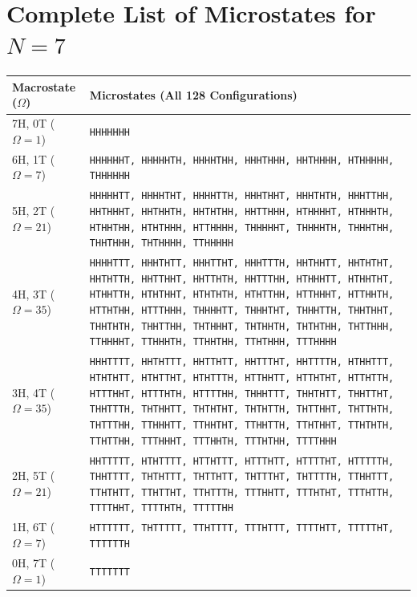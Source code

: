 \documentclass[11pt, a4paper]{article}
\begin{document}
\section{Complete List of Microstates for $N=7$}
\label{app:n7}
\begin{center}
\footnotesize
\begin{tabularx}{\linewidth}{@{}l>{\raggedright\arraybackslash}X@{}}
\toprule
\textbf{Macrostate ($\Omega$)} & \textbf{Microstates (All 128 Configurations)} \\
\midrule
7H, 0T ($\Omega=1$) & \texttt{HHHHHHH} \\
\addlinespace[3pt]
6H, 1T ($\Omega=7$) & \texttt{HHHHHHT, HHHHHTH, HHHHTHH, HHHTHHH, HHTHHHH, HTHHHHH, THHHHHH} \\
\addlinespace[3pt]
5H, 2T ($\Omega=21$) & \texttt{HHHHHTT, HHHHTHT, HHHHTTH, HHHTHHT, HHHTHTH, HHHTTHH, HHTHHHT, HHTHHTH, HHTHTHH, HHTTHHH, HTHHHHT, HTHHHTH, HTHHTHH, HTHTHHH, HTTHHHH, THHHHHT, THHHHTH, THHHTHH, THHTHHH, THTHHHH, TTHHHHH} \\
\addlinespace[3pt]
4H, 3T ($\Omega=35$) & \texttt{HHHHTTT, HHHTHTT, HHHTTHT, HHHTTTH, HHTHHTT, HHTHTHT, HHTHTTH, HHTTHHT, HHTTHTH, HHTTTHH, HTHHHTT, HTHHTHT, HTHHTTH, HTHTHHT, HTHTHTH, HTHTTHH, HTTHHHT, HTTHHTH, HTTHTHH, HTTTHHH, THHHHTT, THHHTHT, THHHTTH, THHTHHT, THHTHTH, THHTTHH, THTHHHT, THTHHTH, THTHTHH, THTTHHH, TTHHHHT, TTHHHTH, TTHHTHH, TTHTHHH, TTTHHHH} \\
\addlinespace[3pt]
3H, 4T ($\Omega=35$) & \texttt{HHHTTTT, HHTHTTT, HHTTHTT, HHTTTHT, HHTTTTH, HTHHTTT, HTHTHTT, HTHTTHT, HTHTTTH, HTTHHTT, HTTHTHT, HTTHTTH, HTTTHHT, HTTTHTH, HTTTTHH, THHHTTT, THHTHTT, THHTTHT, THHTTTH, THTHHTT, THTHTHT, THTHTTH, THTTHHT, THTTHTH, THTTTHH, TTHHHTT, TTHHTHT, TTHHTTH, TTHTHHT, TTHTHTH, TTHTTHH, TTTHHHT, TTTHHTH, TTTHTHH, TTTTHHH} \\
\addlinespace[3pt]
2H, 5T ($\Omega=21$) & \texttt{HHTTTTT, HTHTTTT, HTTHTTT, HTTTHTT, HTTTTHT, HTTTTTH, THHTTTT, THTHTTT, THTTHTT, THTTTHT, THTTTTH, TTHHTTT, TTHTHTT, TTHTTHT, TTHTTTH, TTTHHTT, TTTHTHT, TTTHTTH, TTTTHHT, TTTTHTH, TTTTTHH} \\
\addlinespace[3pt]
1H, 6T ($\Omega=7$) & \texttt{HTTTTTT, THTTTTT, TTHTTTT, TTTHTTT, TTTTHTT, TTTTTHT, TTTTTTH} \\
\addlinespace[3pt]
0H, 7T ($\Omega=1$) & \texttt{TTTTTTT} \\
\bottomrule
\end{tabularx}
\end{center}
\end{document}
